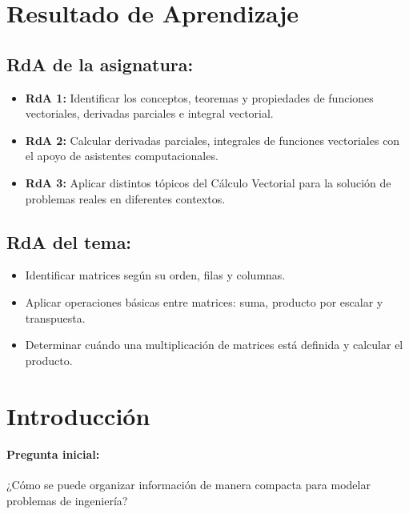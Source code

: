 \documentclass[a4,11pt]{aleph-notas}
\begin{document}
\encabezado

\section*{Resultado de Aprendizaje}  

\subsection*{RdA de la asignatura:}  
\begin{itemize}[leftmargin=*]  
    \item \textbf{RdA 1:} Identificar los conceptos, teoremas y propiedades de funciones vectoriales, derivadas parciales e integral vectorial.
    \item \textbf{RdA 2:} Calcular derivadas parciales, integrales de funciones vectoriales con el apoyo de asistentes computacionales.
    \item \textbf{RdA 3:} Aplicar distintos tópicos del Cálculo Vectorial para la solución de problemas reales en diferentes contextos.
\end{itemize}  

\subsection*{RdA del tema:}  
\begin{itemize}[leftmargin=*]  
    \item Identificar matrices según su orden, filas y columnas.  
    \item Aplicar operaciones básicas entre matrices: suma, producto por escalar y transpuesta.  
    \item Determinar cuándo una multiplicación de matrices está definida y calcular el producto.  
\end{itemize}  

\section*{Introducción}  

\paragraph{Pregunta inicial:}  
¿Cómo se puede organizar información de manera compacta para modelar problemas de ingeniería?
\end{document}
